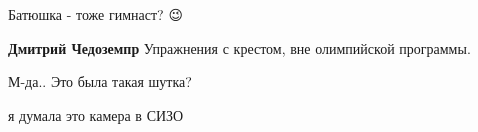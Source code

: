 \begin{itemize}
Батюшка - тоже гимнаст?
😉

\begin{itemize}
 
\textbf{Дмитрий Чедоземпр} Упражнения с крестом, вне олимпийской программы.

 
М-да.. Это была такая шутка?
\end{itemize}

 
я думала это камера в СИЗО

\end{itemize}

